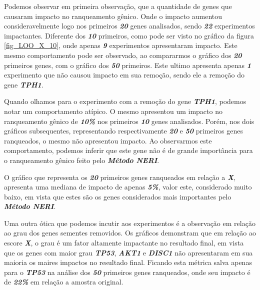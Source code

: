 %
Podemos observar em primeira observação, que a quantidade de genes que causaram impacto no ranqueamento gênico. Onde o impacto aumentou consideravelmente logo nos primeiros \textsl{\textbf{20}} genes analisados, sendo \textsl{\textbf{22}} experimentos impactantes. Diferente dos \textsl{\textbf{10}} primeiros, como pode ser visto no gráfico da figura \ref{fig_LOO_X_10}, onde apenas \textsl{\textbf{9}} experimentos apresentaram impacto. Este mesmo comportamento pode ser observado, ao compararmos o gráfico dos \textsl{\textbf{20}} primeiros genes, com o gráfico dos \textsl{\textbf{50}} primeiros. Este ultimo apresenta apenas \textsl{\textbf{1}} experimento que não causou impacto em sua remoção, sendo ele a remoção do gene \textsl{\textbf{TPH1}}.

%
Quando olhamos para o experimento com a remoção do gene \textsl{\textbf{TPH1}}, podemos notar um comportamento atípico. O mesmo apresentou um impacto no ranqueamento gênico de \textsl{\textbf{10\%}} nos primeiros \textsl{\textbf{10}} genes analisados. Porém, nos dois gráficos subsequentes, representando respectivamente \textsl{\textbf{20}} e \textsl{\textbf{50}} primeiros genes ranqueados, o mesmo não apresentou impacto. Ao observarmos este comportamento, podemos inferir que este gene não é de grande importância para o ranqueamento gênico feito pelo \textsl{\textbf{Método NERI}}.

%
O gráfico que representa os \textsl{\textbf{20}} primeiros genes ranqueados em relação a \textsl{\textbf{X}}, apresenta uma mediana de impacto de apenas \textsl{\textbf{5\%}}, valor este, considerado muito baixo, em vista que estes são os genes considerados mais importantes pelo \textsl{\textbf{Método NERI}}.

%
Uma outra ótica que podemos incutir aos experimentos é a observação em relação ao grau dos genes sementes removidos. Os gráficos demonstram que em relação ao escore \textsl{\textbf{X}}, o grau é um fator altamente impactante no resultado final, em vista que os genes com maior grau \textsl{\textbf{TP53}}, \textsl{\textbf{AKT1}} e \textsl{\textbf{DISC1}} não apresentaram em sua maioria os maires impactos no resultado final. Ficando esta métrica salva apenas para o \textsl{\textbf{TP53}} na análise dos \textsl{\textbf{50}} primeiros genes ranqueados, onde seu impacto é de \textsl{\textbf{22\%}} em relação a amostra original.

%


%
%
